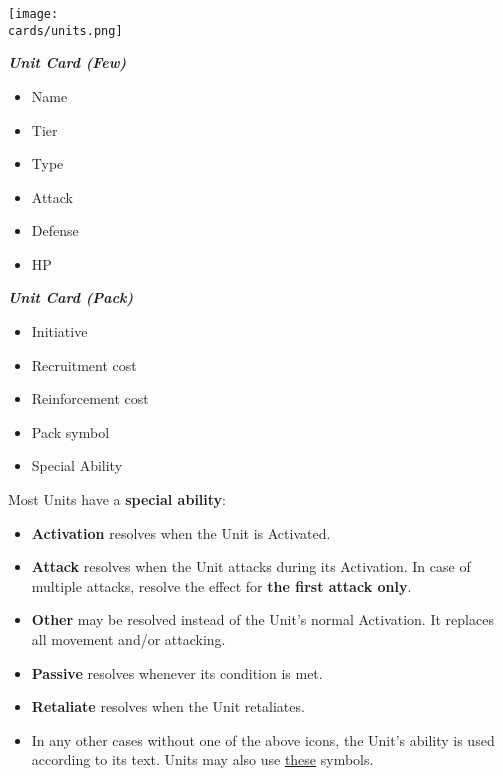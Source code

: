 \begin{multicols}{2}
\begin{center}
  \texttt{[image: \\cards/units.png]}
\end{center}
\vspace{-1em}
\begin{multicols*}{2}
  \footnotesize
  \begin{center}
    \textbf{\textit{\textcolor{darkcandyapplered}{Unit Card (Few)}}}
  \end{center}
  \begin{itemize}
    \item[\textbf{1.}] {Name}
    \item[\textbf{2.}] {Tier}
    \item[\textbf{3.}] {Type}
    \item[\textbf{4.}] {Attack}
    \item[\textbf{5.}] {Defense}
    \item[\textbf{6.}] {HP}
  \end{itemize}
  \columnbreak
  \begin{center}
    \textbf{\textit{\textcolor{darkcandyapplered}{Unit Card (Pack)}}}
  \end{center}
  \begin{itemize}
    \item[\textbf{7.}] {Initiative}
    \item[\textbf{8.}] {Recruitment cost}
    \item[\textbf{9.}] {Reinforcement cost}
    \item[\textbf{10.}]{Pack symbol}
    \item[\textbf{11.}]{Special Ability}
  \end{itemize}
\end{multicols*}

\bigbreak

Most Units have a \textbf{special ability}:\par
\begin{itemize}[wide]
  \item\textbf{Activation}  resolves when the Unit is Activated.
  \item\textbf{Attack}  resolves when the Unit attacks during its Activation.
    In case of multiple attacks, resolve the effect for \textbf{the first attack only}.
  \item\textbf{Other}  may be resolved instead of the Unit's normal Activation.
    It replaces all movement and/or attacking.
  \item\textbf{Passive}  resolves whenever its condition is met.
  \item\textbf{Retaliate}  resolves when the Unit retaliates.
  \item In any other cases without one of the above icons, the Unit's ability is used according to its text.
    Units may also use \hyperlink{Playerdecks}{these} symbols.
\end{itemize}


\end{multicols}
